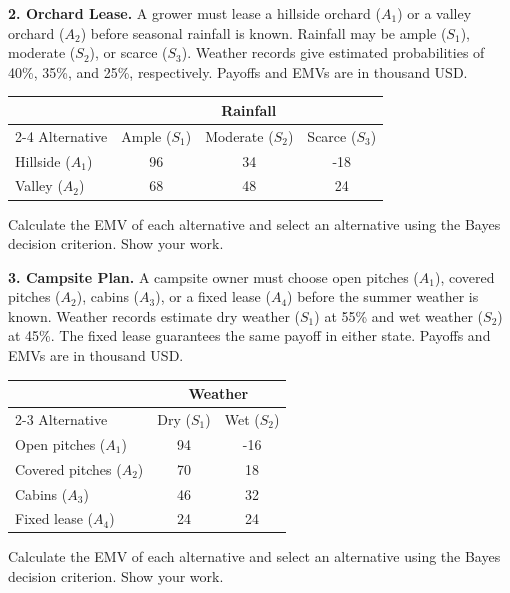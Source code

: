 \noindent\begin{minipage}[t][0.44\textheight][t]{\textwidth}
\textbf{2. Orchard Lease.} A grower must lease a hillside orchard ($A_1$) or a valley orchard ($A_2$)
before seasonal rainfall is known. Rainfall may be ample ($S_1$), moderate
($S_2$), or scarce ($S_3$). Weather records give estimated probabilities
of 40\%, 35\%, and 25\%, respectively. Payoffs and EMVs are in thousand USD.

\begin{center}
			\renewcommand{\arraystretch}{1.3}
			\small
			\begin{tabular}{lccc}
				\toprule
				& \multicolumn{3}{c}{Rainfall} \\
				\cmidrule(lr){2-4}
				Alternative & Ample ($S_1$) & Moderate ($S_2$) & Scarce ($S_3$) \\
				\midrule
				Hillside ($A_1$)  & 96 & 34 & -18 \\
				Valley ($A_2$) & 68 & 48 & 24 \\
				\bottomrule
			\end{tabular}
		\end{center}

Calculate the EMV of each alternative and select an alternative using the Bayes decision criterion. Show your work.
\par\vfill
\end{minipage}\par

\newpage

\noindent\begin{minipage}[t][0.48\textheight][t]{\textwidth}
\textbf{3. Campsite Plan.} A campsite owner must choose open pitches ($A_1$), covered pitches ($A_2$),
cabins ($A_3$), or a fixed lease ($A_4$) before the summer weather is known.
Weather records estimate dry weather ($S_1$) at 55\% and wet weather ($S_2$)
at 45\%. The fixed lease guarantees the same payoff in either state.
Payoffs and EMVs are in thousand USD.

\begin{center}
			\renewcommand{\arraystretch}{1.3}
			\small
			\begin{tabular}{lcc}
				\toprule
				& \multicolumn{2}{c}{Weather} \\
				\cmidrule(lr){2-3}
				Alternative & Dry ($S_1$) & Wet ($S_2$) \\
				\midrule
				Open pitches ($A_1$)   & 94 & -16 \\
				Covered pitches ($A_2$)  & 70 & 18 \\
				Cabins ($A_3$)   & 46 & 32 \\
				Fixed lease ($A_4$) & 24 & 24 \\
				\bottomrule
			\end{tabular}
		\end{center}

Calculate the EMV of each alternative and select an alternative using the Bayes decision criterion. Show your work.
\par\vfill
\end{minipage}\par

